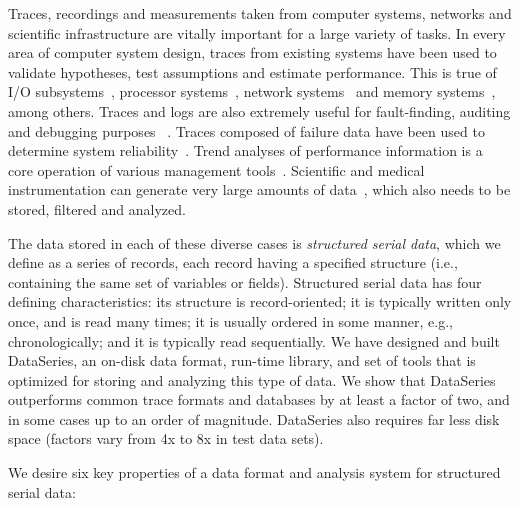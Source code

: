 \documentclass{acm_proc_article-sp}
\begin{document}
Traces, recordings and measurements taken from computer systems,
networks and scientific infrastructure are vitally important for a
large variety of tasks. In every area of computer system design,
traces from existing systems have been used to validate hypotheses,
test assumptions and estimate performance. This is true of I/O
subsystems~\cite{IORef,Ji03,Uysal03}, processor
systems~\cite{ProcRef}, network systems~\cite{NetRef} and memory
systems~\cite{MemRef}, among others. Traces and logs are also
extremely useful for fault-finding, auditing and debugging purposes
~\cite{DebugRef}. Traces composed of failure data have been used to
determine system reliability~\cite{ReliabilityRef, Schroeder07,
Pinheiro07}. Trend analyses of performance information is a core
operation of various management tools~\cite{MgmtRef}. Scientific and
medical instrumentation can generate very large amounts of
data~\cite{SciRef}, which also needs to be stored, filtered and
analyzed.

The data stored in each of these diverse cases is {\it structured
serial data}, which we define as a series of records, each record
having a specified structure (i.e., containing the same set of
variables or fields). Structured serial data has four defining characteristics:
its structure is record-oriented; it is typically written only once,
and is read many times; it is usually ordered
in some manner, e.g., chronologically; and it is typically read
sequentially.  We have designed and built DataSeries, an on-disk 
data format, run-time library, and set of
tools that is optimized for storing and analyzing this type of data.
We show that 
DataSeries outperforms
common trace formats and databases by at
least a factor of two, and in some cases up to an order of
magnitude. DataSeries also requires far less disk space (factors vary
from 4x to 8x in test data sets).


We desire six key properties of a data format and analysis system for
structured serial data:
\end{document}
